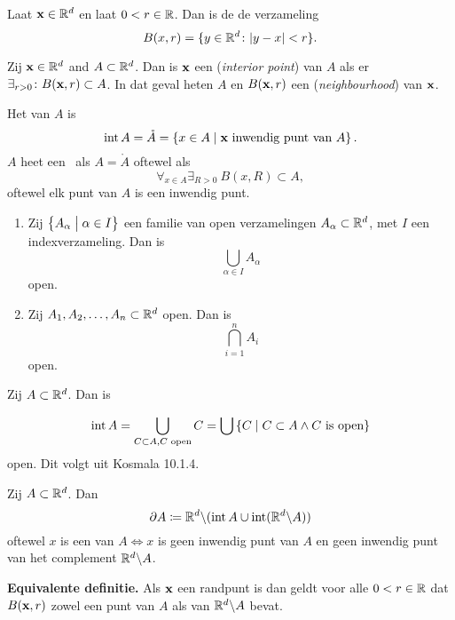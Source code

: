 \documentclass{2wa40summary}
\begin{document}
	\begin{define}[Bol]
		Laat ${\textbf{x}}\in\mathbb{R}^d$ en laat $0<r\in\mathbb{R}$. Dan is de  de verzameling
		\[
		B(x,r)=\lbrace y \in \mathbb{R}^d \colon {\left|y-x\right|}<r\rbrace.
		\]
		
	\end{define}
	\begin{define} Zij ${\textbf{x}} \in \mathbb{R}^d$ and $A \subset \mathbb{R}^d$. Dan is ${\textbf{x}}$ een
		 (\textit{interior point}) van $A$
		als er $\exists_{r>0}\colon B({\textbf{x}},r) \subset A$.
		In dat geval heten $A$ en $B({\textbf{x}},r)$ een  (\textit{neighbourhood}) van ${\textbf{x}}$.
	\end{define}
	\begin{define}
		Het  van $A$ is
		\[\operatorname{\mathop{int}} A=\mathring{A}=\left\lbrace x \in A \mid {\textbf{x}} \text{ inwendig punt van } A\right\rbrace . \]
		$A$ heet een \ als $A=\mathring{A}$ oftewel als
		\[
		\forall _{x \in A} \exists _{R >0}\: B(x,R) \subset A,
		\]
		oftewel elk punt van $A$ is een inwendig punt.
	\end{define}
	\begin{theorem}
		\begin{enumerate}[(1)]
			\item Zij $\left\lbrace A_\alpha \bigm| \alpha \in I \right\rbrace$ een familie van open verzamelingen $A_\alpha \subset \mathbb{R}^d$, met $I$ een indexverzameling. Dan is
			\[
			\bigcup_{\alpha \in I}A_\alpha
			\]
			open.
			\item Zij $A_1,A_2,\dots,A_n \subset \mathbb{R}^d$ open. Dan is
			\[
			\bigcap_{i=1}^{n}A_i
			\]
			open.
		\end{enumerate}
	\end{theorem}
	\begin{theorem}
		Zij $A\subset\mathbb{R}^d$. Dan is
		\item \[\operatorname{\mathop{int}} A=\bigcup_{C \subset A, C \text{ open} }C=\bigcup \left\lbrace C \mid C \subset A \wedge C \text{ is open}\right\rbrace\]
		open. Dit volgt uit Kosmala 10.1.4.
	\end{theorem}
	\begin{define}
		Zij $A \subset \mathbb{R}^d$. Dan
		\[\partial A\coloneqq  \mathbb{R}^d\backslash (\operatorname{\mathop{int}} A \cup \operatorname{\mathop{int}} (\mathbb{R}^d\backslash A))\]
		oftewel $x$ is een  van $A \iff x$ is geen inwendig punt van $A$ en geen inwendig punt van het complement $\mathbb{R}^d\backslash A$.
		
		\textbf{Equivalente definitie.} Als ${\textbf{x}}$ een randpunt is dan geldt voor alle $0<r\in\mathbb{R}$ dat
		$B({\textbf{x}},r)$ zowel een punt van $A$ als van $\mathbb{R}^d \backslash A$ bevat.
	\end{define}
\end{document}
